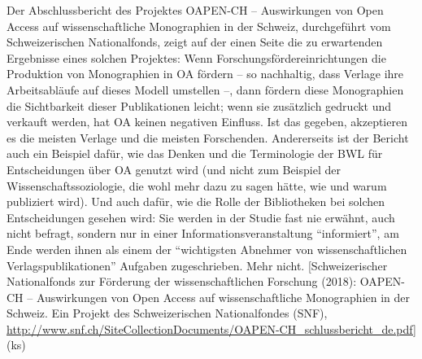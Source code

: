\documentclass[a4paper,
fontsize=11pt,
oneside,
numbers=noperiodatend,
parskip=half-,
bibliography=totoc,
final
]{scrartcl}
\begin{document}
Der Abschlussbericht des Projektes OAPEN-CH -- Auswirkungen von Open
Access auf wissenschaftliche Monographien in der Schweiz, durchgeführt
vom Schweizerischen Nationalfonds, zeigt auf der einen Seite die zu
erwartenden Ergebnisse eines solchen Projektes: Wenn
Forschungsfördereinrichtungen die Produktion von Monographien in OA
fördern -- so nachhaltig, dass Verlage ihre Arbeitsabläufe auf dieses
Modell umstellen --, dann fördern diese Monographien die Sichtbarkeit
dieser Publikationen leicht; wenn sie zusätzlich gedruckt und verkauft
werden, hat OA keinen negativen Einfluss. Ist das gegeben, akzeptieren
es die meisten Verlage und die meisten Forschenden. Andererseits ist der
Bericht auch ein Beispiel dafür, wie das Denken und die Terminologie der
BWL für Entscheidungen über OA genutzt wird (und nicht zum Beispiel der
Wissenschaftssoziologie, die wohl mehr dazu zu sagen hätte, wie und
warum publiziert wird). Und auch dafür, wie die Rolle der Bibliotheken
bei solchen Entscheidungen gesehen wird: Sie werden in der Studie fast
nie erwähnt, auch nicht befragt, sondern nur in einer
Informationsveranstaltung \enquote{informiert}, am Ende werden ihnen als
einem der \enquote{wichtigsten Abnehmer von wissenschaftlichen
Verlagspublikationen} Aufgaben zugeschrieben. Mehr nicht.
{[}Schweizerischer Nationalfonds zur Förderung der wissenschaftlichen
Forschung (2018): OAPEN-CH -- Auswirkungen von Open Access auf
wissenschaftliche Monographien in der Schweiz. Ein Projekt des
Schweizerischen Nationalfondes (SNF),
\url{http://www.snf.ch/SiteCollectionDocuments/OAPEN-CH_schlussbericht_de.pdf}{]}
(ks)
\end{document}
